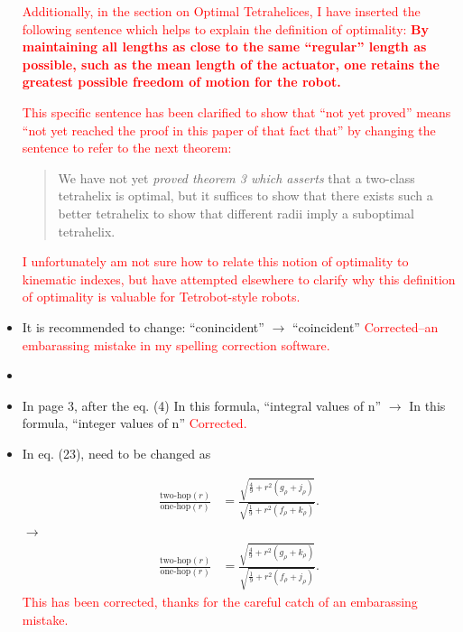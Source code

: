 \documentclass{article}
\newcommand{\highlighttext}[1] {\textcolor{red}{#1}}
\begin{document}
\begin{itemize}
\highlighttext{
  Additionally, in the section on Optimal Tetrahelices, I have inserted the following sentence which helps to
  explain the definition of optimality:
  \bf{By maintaining all lengths as close to the same ``regular'' length as possible,
such as the mean length of the actuator,
one retains the greatest possible freedom of motion for the robot.}
  }

\highlighttext{This specific sentence has been clarified to show that ``not yet proved'' means
  ``not yet reached the proof in this paper of that fact that'' by changing the sentence to refer
  to the next theorem:
  \begin{quote}
  We have not yet {\em
proved theorem 3 which asserts} that a two-class tetrahelix is optimal, but it suffices to show that there
exists such a better tetrahelix to show that different radii imply a suboptimal
tetrahelix.
  \end{quote}
  I unfortunately am not sure how to relate this notion of optimality to kinematic indexes, but
  have attempted elsewhere to clarify why this definition of optimality is valuable for
  Tetrobot-style robots.
  }
\item 
 It is recommended to change:
 ``conincident'' $\rightarrow$ ``coincident''
 \highlighttext{Corrected--an embarassing mistake in my spelling correction software.}
 \item
\item In page 3, after the eq. (4)
  In this formula, ``integral values of n'' $\rightarrow$ In this formula, ``integer values of n''
  \highlighttext{Corrected.}
  \item 
In eq. (23), need to be changed as

\begin{equation}
  \begin{split}
  \frac{\text{two-hop}(r)}{ \text{one-hop}(r)}  &=
  \frac{\sqrt{\frac{4}{9}  + r^2(g_{\rho}+ j_{\rho})}}
       {\sqrt{\frac{1}{9} +r^2(f_{\rho}+k_{\rho}) }} \text{.}
  \end{split}       
\end{equation}
$\rightarrow$ 
\begin{equation}
  \begin{split}
  \frac{\text{two-hop}(r)}{ \text{one-hop}(r)}  &=
  \frac{\sqrt{\frac{4}{9}  + r^2(g_{\rho}+ k_{\rho})}}
       {\sqrt{\frac{1}{9} +r^2(f_{\rho}+j_{\rho}) }} \text{.}
  \end{split}       
\end{equation}
\highlighttext{This has been corrected, thanks for the careful catch of an embarassing mistake.}


\end{itemize}
\end{document}

